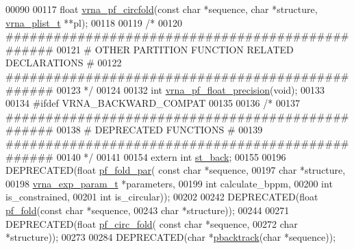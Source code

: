 \begin{DoxyCode}
00090 
00117 \textcolor{keywordtype}{float} \hyperlink{group__pf__fold_ga0175db86e506900c6b1a42fd41562e34}{vrna\_pf\_circfold}(\textcolor{keyword}{const} \textcolor{keywordtype}{char} *sequence, \textcolor{keywordtype}{char} *structure, 
      \hyperlink{group__data__structures_structvrna__plist__s}{vrna\_plist\_t} **pl);
00118 
00119 \textcolor{comment}{/*}
00120 \textcolor{comment}{#################################################}
00121 \textcolor{comment}{# OTHER PARTITION FUNCTION RELATED DECLARATIONS #}
00122 \textcolor{comment}{#################################################}
00123 \textcolor{comment}{*/}
00124 
00132 \textcolor{keywordtype}{int} \hyperlink{part__func_8h_ad2b3594f0b50b68029e0f54fdce59313}{vrna\_pf\_float\_precision}(\textcolor{keywordtype}{void});
00133 
00134 \textcolor{preprocessor}{#ifdef  VRNA\_BACKWARD\_COMPAT}
00135 
00136 \textcolor{comment}{/*}
00137 \textcolor{comment}{#################################################}
00138 \textcolor{comment}{# DEPRECATED FUNCTIONS                          #}
00139 \textcolor{comment}{#################################################}
00140 \textcolor{comment}{*/}
00141 
00154 \textcolor{keyword}{extern}  \textcolor{keywordtype}{int} \hyperlink{group__subopt__stochbt_gacd79b1a570e6ad9be24cb11fe8cae30a}{st\_back};
00155 
00196 DEPRECATED(\textcolor{keywordtype}{float}   \hyperlink{group__pf__fold_gac4f95bee734b2563a3d6e9932117ebdf}{pf\_fold\_par}(  \textcolor{keyword}{const} \textcolor{keywordtype}{char} *sequence,
00197                       \textcolor{keywordtype}{char} *structure,
00198                       \hyperlink{group__energy__parameters_structvrna__exp__param__s}{vrna\_exp\_param\_t} *parameters,
00199                       \textcolor{keywordtype}{int} calculate\_bppm,
00200                       \textcolor{keywordtype}{int} is\_constrained,
00201                       \textcolor{keywordtype}{int} is\_circular));
00202 
00242 DEPRECATED(\textcolor{keywordtype}{float}   \hyperlink{group__pf__fold_gadc3db3d98742427e7001a7fd36ef28c2}{pf\_fold}(\textcolor{keyword}{const} \textcolor{keywordtype}{char} *sequence,
00243                 \textcolor{keywordtype}{char} *structure));
00244 
00271 DEPRECATED(\textcolor{keywordtype}{float}   \hyperlink{group__pf__fold_ga819ce5fca8984004ac81c4a3b04cb735}{pf\_circ\_fold}( \textcolor{keyword}{const} \textcolor{keywordtype}{char} *sequence,
00272                       \textcolor{keywordtype}{char} *structure));
00273 
00284 DEPRECATED(\textcolor{keywordtype}{char}    *\hyperlink{group__subopt__stochbt_gac03ca6db186bb3bf0a2a326d7fb3ba03}{pbacktrack}(\textcolor{keywordtype}{char} *sequence));

\end{DoxyCode}
